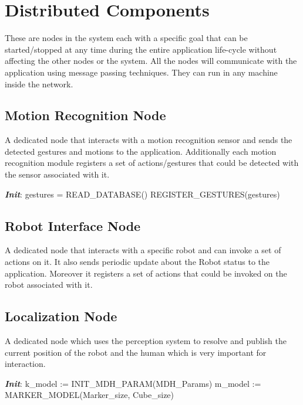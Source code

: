 \section{Distributed Components}
\label{ssec:dist_comp}
These are nodes in the system each with a specific goal that can be started/stopped at any time during the entire application life-cycle without affecting the other nodes or the system. All the nodes will communicate with the application using message passing techniques. They can run in any machine inside the network.

\subsection{Motion Recognition Node} A dedicated node that interacts with a motion recognition sensor and sends the detected gestures and motions to the application. Additionally each motion recognition module registers a set of actions/gestures that could be detected with the sensor associated with it.
\begin{algorithm}
 \textbf{\emph{Init}}:\;
 \quad gestures = READ\_DATABASE() \;
 \quad REGISTER\_GESTURES(gestures) \;
\end{algorithm}

\subsection{Robot Interface Node} A dedicated node that interacts with a specific robot and can invoke a set of actions on it. It also sends periodic update about the Robot status to the application. Moreover it registers a set of actions that could be invoked on the robot associated with it.
\subsection{Localization Node} A dedicated node which uses the perception system to resolve and publish the current position of the robot and the human which is very important for interaction.

\begin{algorithm}
 \textbf{\emph{Init}}:\;
 k\_model := INIT\_MDH\_PARAM(MDH\_Params)\;
 m\_model := MARKER\_MODEL(Marker\_size, Cube\_size)\;
\end{algorithm}


